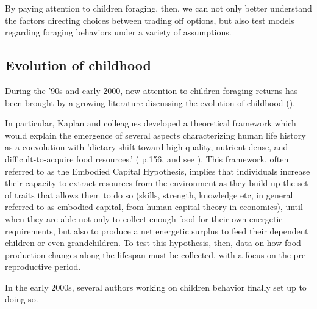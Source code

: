 By paying attention to children foraging, then, we can not only better understand the factors directing choices between trading off options, but also test models regarding foraging behaviors under a variety of assumptions.

\subsection{Evolution of childhood}
During the '90s and early 2000, new attention to children foraging returns has been brought by a growing literature discussing the evolution of childhood (\cite{bogin_evolutionary_1997}).%

In particular, Kaplan and colleagues developed a theoretical framework which would explain the emergence of several aspects characterizing human life history as a coevolution with 'dietary shift toward high-quality, nutrient-dense, and difficult-to-acquire food resources.' (\cite{kaplan_theory_2000} p.156, and see \cite{kaplan_theory_1996, kaplan_evolution_1997, kaplan_embodied_2001, kaplan_emergence_2002, kaplan_embodied_2003, kaplan_neural_2003, kaplan_life_2006, kaplan_evolution_2007}). %
This framework, often referred to as the Embodied Capital Hypothesis, implies that individuals increase their capacity to extract resources from the environment as they build up the set of traits that allows them to do so (skills, strength, knowledge etc, in general referred to as embodied capital, from human capital theory in economics), until when they are able not only to collect enough food for their own energetic requirements, but also to produce a net energetic surplus to feed their dependent children or even grandchildren. To test this hypothesis, then, data on how food production changes along the lifespan must be collected, with a focus on the pre-reproductive period.

In the early 2000s, several authors working on children behavior finally set up to doing so. 

